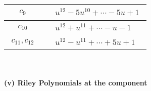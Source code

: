 \documentclass[1p]{elsarticle_modified}
\theoremstyle{definition}
\begin{document}
\begin{tabular}{m{50pt}|m{274pt}}
\hline $$\begin{aligned}c_{9}\end{aligned}$$&$\begin{aligned}
&u^{12}-5 u^{10}+\cdots-5 u+1
\end{aligned}$\\
\hline $$\begin{aligned}c_{10}\end{aligned}$$&$\begin{aligned}
&u^{12}+u^{11}+\cdots- u-1
\end{aligned}$\\
\hline $$\begin{aligned}c_{11},c_{12}\end{aligned}$$&$\begin{aligned}
&u^{12}- u^{11}+\cdots+5 u+1
\end{aligned}$\\
\hline
\end{tabular}\\~\\
\newpage\renewcommand{\arraystretch}{1}
\flushleft \textbf{(v) Riley Polynomials at the component}\newline \\
\end{document}
